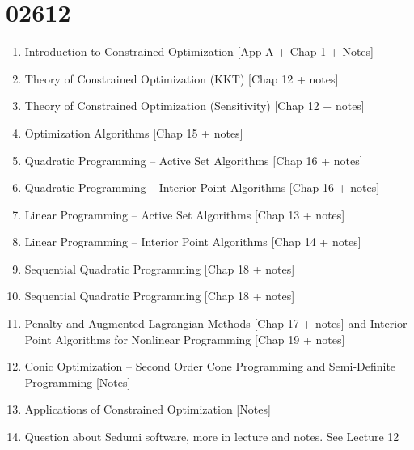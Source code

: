 \part{02612}

\begin{enumerate}
  \item Introduction to Constrained Optimization [App A + Chap 1 + Notes]
  \item Theory of Constrained Optimization (KKT) [Chap 12 + notes]
  \item Theory of Constrained Optimization (Sensitivity) [Chap 12 + notes]
  \item Optimization Algorithms [Chap 15 + notes]
  \item Quadratic Programming – Active Set Algorithms [Chap 16 + notes]
  \item Quadratic Programming – Interior Point Algorithms [Chap 16 + notes]
  \item Linear Programming – Active Set Algorithms [Chap 13 + notes]
  \item Linear Programming – Interior Point Algorithms [Chap 14 + notes]
  \item Sequential Quadratic Programming [Chap 18 + notes]
  \item Sequential Quadratic Programming [Chap 18 + notes]
  \item Penalty and Augmented Lagrangian Methods [Chap 17 + notes] and Interior Point Algorithms for Nonlinear Programming [Chap 19 + notes]
  \item Conic Optimization – Second Order Cone Programming and Semi-Definite Programming [Notes]
  \item Applications of Constrained Optimization [Notes]
  \item Question about Sedumi software, more in lecture and notes. See Lecture 12
\end{enumerate} 


 
 
 
 
 
 
 
 
 
 
 
 